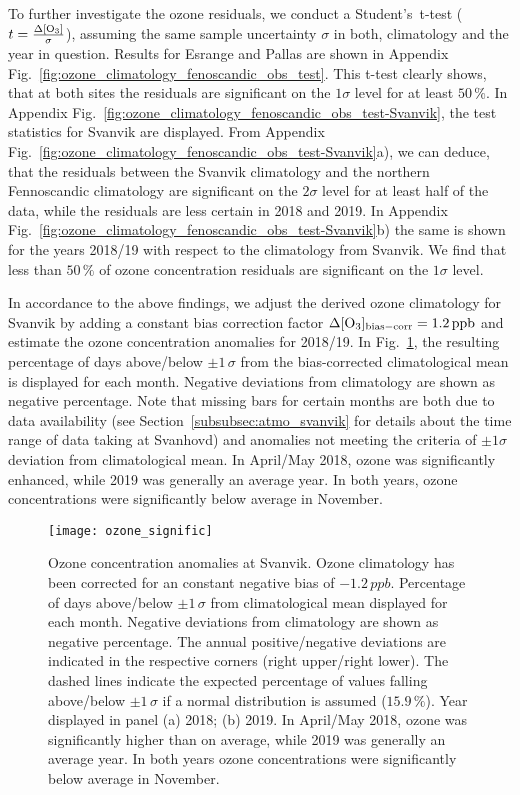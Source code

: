 \documentclass[bg, manuscript]{copernicus}
\begin{document}
To further investigate the ozone residuals, we conduct a Student's~t-test ($t = \frac{\chem{\Delta[O_3]}}{\sigma}$), assuming the same sample uncertainty $\sigma$ in both, climatology and the year in question. Results for Esrange and Pallas are shown in Appendix Fig.~\ref{fig:ozone_climatology_fenoscandic_obs_test}. This t-test clearly shows, that at both sites the residuals are significant on the $1\sigma$ level for at least $50\,\unit{\%}$. In Appendix Fig.~\ref{fig:ozone_climatology_fenoscandic_obs_test-Svanvik}, the test statistics for Svanvik are displayed. From Appendix Fig.~\ref{fig:ozone_climatology_fenoscandic_obs_test-Svanvik}a), we can deduce, that the residuals between the Svanvik climatology and the northern Fennoscandic climatology are significant on the $2\sigma$ level for at least half of the data, while the residuals are less certain in 2018 and 2019. In Appendix Fig.~\ref{fig:ozone_climatology_fenoscandic_obs_test-Svanvik}b) the same is shown for the years 2018/19 with respect to the climatology from Svanvik. We find that less than $50\,\unit{\%}$ of ozone concentration residuals are significant on the $1\sigma$ level.

In accordance to the above findings, we adjust the derived ozone climatology for Svanvik by adding a constant bias correction factor $\Delta\chem{[O_3]_\mathrm{bias-corr}} = 1.2\,\unit{ppb}$ and estimate the ozone concentration anomalies for 2018/19. In Fig.~\ref{fig:ozone_signific}, the resulting percentage of days above/below $\pm 1\,\sigma$ from the bias-corrected climatological mean is displayed for each month. Negative deviations from climatology are shown as negative percentage. Note that missing bars for certain months are both due to data availability (see Section~\ref{subsubsec:atmo_svanvik} for details about the time range of data taking at Svanhovd) and anomalies not meeting the criteria of $\pm 1\sigma$ deviation from climatological mean. In April/May 2018, ozone was significantly enhanced, while 2019 was generally an average year. In both years, ozone concentrations were significantly below average in November.

\begin{figure}[t]
  \texttt{[image: ozone\_signific]}
  \caption{Ozone concentration anomalies at Svanvik. Ozone climatology has been corrected for an constant negative bias of $-1.2\,\unit{ppb}$. Percentage of days above/below $\pm 1\,\sigma$ from climatological mean displayed for each month. Negative deviations from climatology are shown as negative percentage. The annual positive/negative deviations are indicated in the respective corners (right upper/right lower). The dashed lines indicate the expected percentage of values falling above/below $\pm 1\,\sigma$ if a normal distribution is assumed ($15.9\,\unit{\%}$). Year displayed in panel (a) 2018; (b) 2019. In April/May 2018, ozone was significantly higher than on average, while 2019 was generally an average year. In both years ozone concentrations were significantly below average in November.}
  \label{fig:ozone_signific}
\end{figure}
\end{document}
